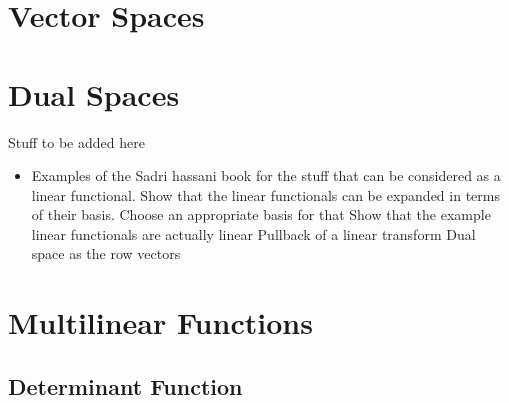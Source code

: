 \section{Vector Spaces}

\section{Dual Spaces}



Stuff to be added here

\begin{itemize}
	\item Examples of the Sadri hassani book for the stuff that can be considered as a linear functional. 
	\subitem Show that the linear functionals can be expanded in terms of their basis. Choose an appropriate basis for that
	\subitem Show that the example linear functionals are actually linear 
	\subitem Pullback of a linear transform
	\subitem Dual space as the row vectors
\end{itemize}


\section{Multilinear Functions}

\subsection {Determinant Function}